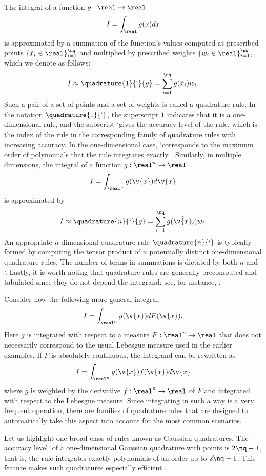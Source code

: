 The integral of a function $g: \real \to \real$
\[
  I = \int_\real g(x) dx
\]
is approximated by a summation of the function's values computed at prescribed
points $\{ \hat{x}_i \in \real \}_{i = 1}^\nq$ and multiplied by prescribed
weights $\{ w_i \in \real \}_{i = 1}^\nq$, which we denote as follows:
\[
  I \approx \quadrature{1}{\lq}{g} = \sum_{i = 1}^\nq g(\hat{x}_i) w_i.
\]
Such a pair of a set of points and a set of weights is called a quadrature rule.
In the notation $\quadrature{1}{\lq}$, the superscript $1$ indicates that it is
a one-dimensional rule, and the subscript \lq gives the accuracy level of the
rule, which is the index of the rule in the corresponding family of quadrature
rules with increasing accuracy. In the one-dimensional case, \lq corresponds to
the maximum order of polynomials that the rule integrates exactly
\cite{heiss2008}. Similarly, in multiple dimensions, the integral of a function
$g: \real^n \to \real$
\[
  I = \int_{\real^n} g(\v{x}) d\v{x}
\]
is approximated by
\[
  I \approx \quadrature{n}{\lq}{g} = \sum_{i = 1}^\nq g(\hat{\v{x}}_i) w_i.
\]
An appropriate $n$-dimensional quadrature rule $\quadrature{n}{\lq}$ is
typically formed by computing the tensor product of $n$ potentially distinct
one-dimensional quadrature rules. The number of terms \nq in summations is
dictated by both $n$ and \lq. Lastly, it is worth noting that quadrature rules
are generally precomputed and tabulated since they do not depend the integrand;
see, for instance, \cite{burkardt}.

Consider now the following more general integral:
\[
  I = \int_{\real^n} g(\v{x}) dF(\v{x}).
\]
Here $g$ is integrated with respect to a measure $F: \real^n \to \real$
\cite{durrett2010} that does not necessarily correspond to the usual Lebesgue
measure used in the earlier examples. If $F$ is absolutely continuous, the
integrand can be rewritten as
\[
  I = \int_{\real^n} g(\v{x}) f(\v{x}) d\v{x}
\]
where $g$ is weighted by the derivative $f: \real^n \to \real$ of $F$ and
integrated with respect to the Lebesgue measure. Since integrating in such a way
is a very frequent operation, there are families of quadrature rules that are
designed to automatically take this aspect into account for the most common
scenarios.

Let us highlight one broad class of rules known as Gaussian quadratures. The
accuracy level \lq of a one-dimensional Gaussian quadrature with \nq points is
$2 \nq - 1$, that is, the rule integrates exactly polynomials of an order up to
$2 \nq - 1$. This feature makes such quadratures especially efficient
\cite{heiss2008}.

